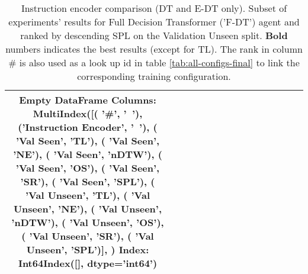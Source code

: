 \begin{table}
\centering
\caption{\label{tab:f_dt_instruction_encoding}Instruction encoder comparison (DT and E-DT only). Subset of experiments' results for Full Decision Transformer ('F-DT') agent and ranked by descending SPL on the Validation Unseen split. \textbf{Bold} numbers indicates the best results (except for TL). The rank in column \# is also used as a look up id in table \ref{tab:all-configs-final} to link the corresponding training configuration.}
\begin{tabular}{@{\hskip3pt}c@{\hskip3pt}c@{\hskip3pt}c@{\hskip3pt}c@{\hskip3pt}c@{\hskip3pt}c@{\hskip3pt}c@{\hskip3pt}c@{\hskip3pt}c@{\hskip3pt}c@{\hskip3pt}c@{\hskip3pt}c@{\hskip3pt}c@{\hskip3pt}c@{\hskip3pt}c}
\toprule
Empty DataFrame
Columns: MultiIndex([(                 '\textbf{\#}',    '\textbf{~}'),
            ('\textbf{Instruction Encoder}',    '\textbf{~}'),
            (           '\textbf{Val Seen}',   '\textbf{TL}'),
            (           '\textbf{Val Seen}',   '\textbf{NE}'),
            (           '\textbf{Val Seen}', '\textbf{nDTW}'),
            (           '\textbf{Val Seen}',   '\textbf{OS}'),
            (           '\textbf{Val Seen}',   '\textbf{SR}'),
            (           '\textbf{Val Seen}',  '\textbf{SPL}'),
            (         '\textbf{Val Unseen}',   '\textbf{TL}'),
            (         '\textbf{Val Unseen}',   '\textbf{NE}'),
            (         '\textbf{Val Unseen}', '\textbf{nDTW}'),
            (         '\textbf{Val Unseen}',   '\textbf{OS}'),
            (         '\textbf{Val Unseen}',   '\textbf{SR}'),
            (         '\textbf{Val Unseen}',  '\textbf{SPL}')],
           )
Index: Int64Index([], dtype='int64') \\
\bottomrule
\end{tabular}
\end{table}
